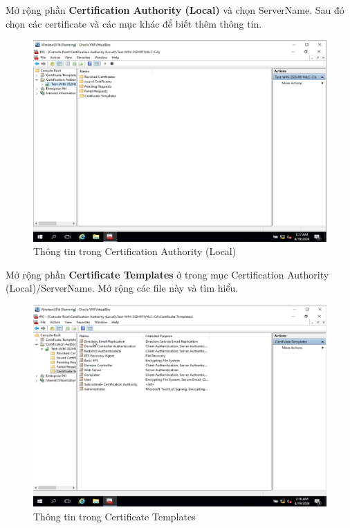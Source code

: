 \newpage
{} Mở rộng phần \textbf{Certification Authority (Local)} và chọn ServerName. Sau đó chọn các certificate và các mục khác để biết thêm thông tin.

\begin{figure}[!htb]
    \centering
    \includegraphics[width=0.9\linewidth]{figure//chapter4//lab4_2/ca_local.png}
    \caption{Thông tin trong Certification Authority (Local)}
    \label{fig:enter-label}
\end{figure}

 Mở rộng phần \textbf{Certificate Templates} ở trong mục Certification Authority (Local)/ServerName. Mở rộng các file này và tìm hiểu.

\begin{figure}[!htb]
    \centering
    \includegraphics[width=0.9\linewidth]{figure//chapter4//lab4_2/cert_temp.png}
    \caption{Thông tin trong Certificate Templates}
    \label{fig:enter-label}
\end{figure}

